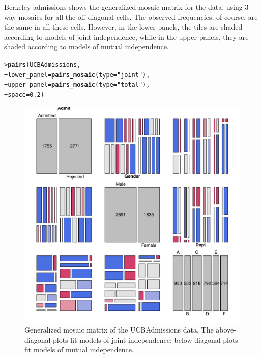 \documentclass[10pt,krantz2]{krantz}\usepackage[]{graphicx}\usepackage[]{color}
\makeatletter
\newcommand{\hlnum}[1]{\textcolor[rgb]{0.686,0.059,0.569}{#1}}%
\newcommand{\hlstr}[1]{\textcolor[rgb]{0.192,0.494,0.8}{#1}}%
\newcommand{\hlstd}[1]{\textcolor[rgb]{0.345,0.345,0.345}{#1}}%
\newcommand{\hlkwc}[1]{\textcolor[rgb]{0.333,0.667,0.333}{#1}}%
\newcommand{\hlkwd}[1]{\textcolor[rgb]{0.737,0.353,0.396}{\textbf{#1}}}%
\newenvironment{kframe}{%
 \def\at@end@of@kframe{}%
 \ifinner\ifhmode%
  \def\at@end@of@kframe{\end{minipage}}%
  \begin{minipage}{\columnwidth}%
 \fi\fi%
 \def\FrameCommand##1{\hskip\@totalleftmargin \hskip-\fboxsep
 \colorbox{shadecolor}{##1}\hskip-\fboxsep
     \hskip-\linewidth \hskip-\@totalleftmargin \hskip\columnwidth}%
 \MakeFramed {\advance\hsize-\width
   \@totalleftmargin\z@ \linewidth\hsize
   \@setminipage}}%
 {\par\unskip\endMakeFramed%
 \at@end@of@kframe}
\newenvironment{knitrout}{}{} %
\renewenvironment{knitrout}{\small\renewcommand{\baselinestretch}{.85}}{} %
\makeatother
\begin{document}
\begin{Example}[berkeley4b]{Berkeley admissions}
 shows the generalized mosaic matrix for the 
data, using 3-way mosaics for all the off-diagonal cells.
The observed frequencies, of course, are the same in all these cells.
However, in the lower panels, the tiles are shaded according to models of
joint independence, while in the upper panels, they are shaded according to
models of mutual independence.
\begin{knitrout}
\color{fgcolor}\begin{kframe}
\begin{alltt}
\hlstd{> }\hlkwd{pairs}\hlstd{(UCBAdmissions,}
\hlstd{+ }      \hlkwc{lower_panel} \hlstd{=} \hlkwd{pairs_mosaic}\hlstd{(}\hlkwc{type} \hlstd{=} \hlstr{"joint"}\hlstd{),}
\hlstd{+ }      \hlkwc{upper_panel} \hlstd{=} \hlkwd{pairs_mosaic}\hlstd{(}\hlkwc{type} \hlstd{=} \hlstr{"total"}\hlstd{),}
\hlstd{+ }      \hlkwc{space}\hlstd{=}\hlnum{0.2}\hlstd{)}
\end{alltt}
\end{kframe}\begin{figure}[!htb]

\centerline{\includegraphics[width=.8\textwidth]{ch05/fig/berk-pairs2-1} }

\caption[Generalized mosaic matrix of the UCBAdmissions data]{Generalized mosaic matrix of the UCBAdmissions data. The above-diagonal plots fit models of joint independence; below-diagonal plots fit models of mutual independence.}\label{fig:berk-pairs2}
\end{figure}



\end{knitrout}
\end{Example}
\end{document}
